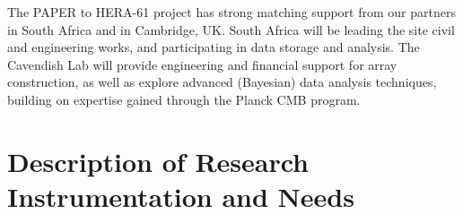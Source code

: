\documentclass[preprint]{aastex}
\begin{document}
The PAPER to HERA-61 project has
strong matching support from our partners in South Africa and in Cambridge, UK.  
South Africa will be leading the site civil and engineering
works, and participating in data storage and analysis. The Cavendish Lab
will provide engineering and financial support for array construction, as well as 
explore advanced (Bayesian) data analysis techniques, building on expertise
gained through the Planck CMB program.



\vspace{-0.25in}
\section{Description of Research Instrumentation and Needs}
\vspace{-6pt}



\end{document}
